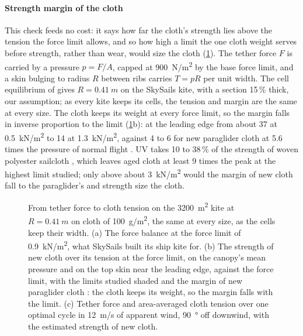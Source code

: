 \paragraph{Strength margin of the cloth}
\label{sec:cloth_check}
\label{app:cloth_tension}
This check feeds no cost: it says how far the cloth's strength lies above the tension the force limit allows, and so how high a limit the one cloth weight serves before strength, rather than wear, would size the cloth (\cref{fig:canopy_tension}). The tether force $F$ is carried by a pressure $p=F/A$, capped at \SI{900}{N/m^2} by the base force limit, and a skin bulging to radius $R$ between ribs carries $T=pR$ per unit width. The cell equilibrium of \citet{wang2018} gives $R=\SI{0.41}{m}$ on the SkySails kite, with a section 15\,\% thick, our assumption; as every kite keeps its cells, the tension and margin are the same at every size.  The cloth keeps its weight at every force limit, so the margin falls in inverse proportion to the limit (\cref{fig:canopy_tension}b): at the leading edge from about 37 at \SI{0.5}{kN/m^2} to 14 at \SI{1.3}{kN/m^2}, against 4 to 6 for new paraglider cloth at 5.6 times the pressure of normal flight \citep{maslanka2023}. UV takes 10 to 38\,\% of the strength of woven polyester sailcloth \citep[Table~3]{ceylan2023}, which leaves aged cloth at least 9 times the peak at the highest limit studied; only above about \SI{3}{kN/m^2} would the margin of new cloth fall to the paraglider's and strength size the cloth.

\begin{figure}[tbp]
\centering
{}
\caption{ From tether force to cloth tension on the \SI{3200}{m^2} kite at $R=\SI{0.41}{m}$ on cloth of \SI{100}{g/m^2}, the same at every size, as the cells keep their width. (a) The force balance at the force limit of \SI{0.9}{kN/m^2}, what SkySails built its ship kite for. (b) The strength of new cloth over its tension at the force limit, on the canopy's mean pressure and on the top skin near the leading edge, against the force limit, with the limits studied shaded and the margin of new paraglider cloth \citep{maslanka2023}: the cloth keeps its weight, so the margin falls with the limit. (c) Tether force and area-averaged cloth tension over one optimal cycle in \SI{12}{m/s} of apparent wind, \SI{90}{\degree} off downwind, with the estimated strength of new cloth.}
\label{fig:canopy_tension}
\end{figure}

